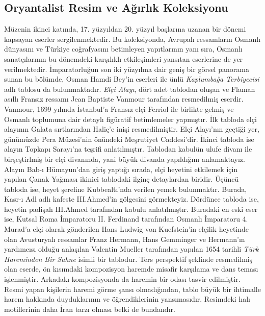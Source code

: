 \subsection{Oryantalist Resim ve Ağırlık Koleksiyonu}
\indent\indent Müzenin ikinci katında, 17. yüzyıldan 20. yüzyıl başlarına uzanan bir dönemi kapsayan eserler sergilenmektedir. Bu koleksiyonda, Avrupalı ressamların Osmanlı dünyasını ve Türkiye coğrafyasını betimleyen yapıtlarının yanı sıra, Osmanlı sanatçılarının bu dönemdeki karşılıklı etkileşimleri yansıtan eserlerine de yer verilmektedir. İmparatorluğun son iki yüzyılına dair geniş bir görsel panorama sunan bu bölümde, Osman Hamdi Bey’in eserleri ile ünlü \textit{Kaplumbağa Terbiyecisi} adlı tablosu da bulunmaktadır.\newline
\indent \textit{Elçi Alayı}, dört adet tablodan oluşan ve Flaman asıllı Fransız ressamı Jean Baptiste Vanmour tarafından resmedilmiş eserdir. Vanmour, 1699 yılında İstanbul’a Fransız elçi Ferriol ile birlikte gelmiş ve Osmanlı toplumuna dair detaylı figüratif betimlemeler yapmıştır. İlk tabloda elçi alayının Galata sırtlarından Haliç'e inişi resmedilmiştir. Elçi Alayı'nın geçtiği yer, günümüzde Pera Müzesi'nin önündeki Meşrutiyet Caddesi'dir. İkinci tabloda ise alayın Topkapı Sarayı'na teşrifi anlatılmıştır. Tablodan kabulün ulufe divanı ile birşeştirlmiş bir elçi divanında, yani büyük divanda yapıldığını anlamaktayız. Alayın Bab-ı Hümayun'dan giriş yaptığı sırada, elçi heyetini etkilemek için yapılan Çanak Yağması ikinici tablodaki ilginç detaylardan biridir. Üçüncü tabloda ise, heyet şerefine Kubbealtı'nda verilen yemek bulunmaktır. Burada, Kasr-ı Adl adlı kafeste III.Ahmed'in gölgesini görmekteyiz. Dördünce tabloda ise, heyetin padişah III.Ahmed tarafından kabulu anlatılmıştır. \newline
\indent Buradaki en eski eser ise, Kutsal Roma İmparatoru II. Ferdinand tarafından Osmanlı İmparatoru 4. Murad'a elçi olarak gönderilen Hans Ludwig von Kuefstein’in elçilik heyetinde olan Avusturyalı ressamlar Franz Hermann, Hans Gemminger ve Hermann'ın yardımcısı olduğu anlaşılan Valentin Mueller tarafından yapılan 1654 tarihli \textit{Türk Hareminden Bir Sahne} isimli bir tablodur. Ters perspektif şeklinde resmedilmiş olan eserde, ön kısımdaki kompozisyon haremde misafir karşılama ve dans teması işlenmiştir. Arkadakı kompozisyonda da haremin bir odası tasvir edilmiştir. Resmi yapan kişilerin haremi görme şansı olmadığından, tablo büyük bir ihtimalle harem hakkında duyduklarının ve öğrendiklerinin yansımasıdır. Resimdeki halı motiflerinin daha İran tarzı olması belki de bundandır.\newline
